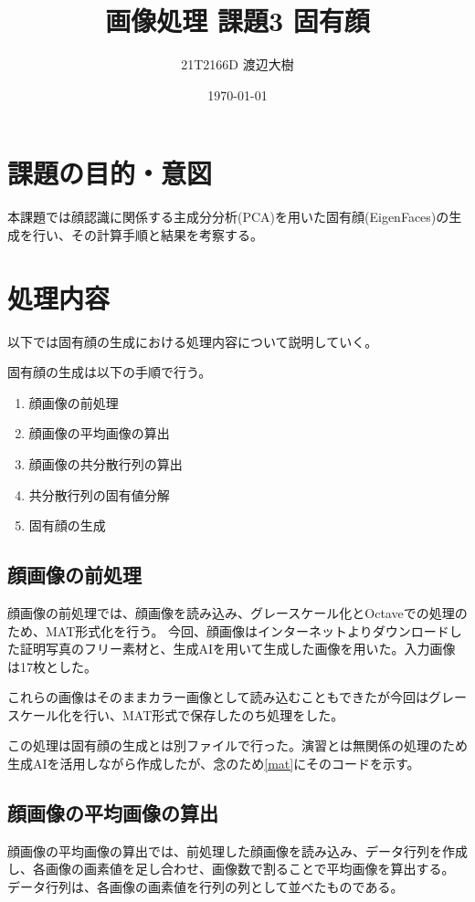 \documentclass[a4paper,11pt,dvipdfmx]{jsarticle}
\begin{document}

\title{画像処理 課題3 固有顔}
\author{21T2166D 渡辺大樹}
\date{\today}
\maketitle

\section{課題の目的・意図}
本課題では顔認識に関係する主成分分析(PCA)を用いた固有顔(EigenFaces)の生成を行い、その計算手順と結果を考察する。

\section{処理内容}
以下では固有顔の生成における処理内容について説明していく。

固有顔の生成は以下の手順で行う。
\begin{enumerate}
    \item 顔画像の前処理
    \item 顔画像の平均画像の算出
    \item 顔画像の共分散行列の算出
    \item 共分散行列の固有値分解
    \item 固有顔の生成
\end{enumerate}

\subsection{顔画像の前処理}
顔画像の前処理では、顔画像を読み込み、グレースケール化とOctaveでの処理のため、MAT形式化を行う。
今回、顔画像はインターネットよりダウンロードした証明写真のフリー素材と、生成AIを用いて生成した画像を用いた。入力画像は17枚とした。

これらの画像はそのままカラー画像として読み込むこともできたが今回はグレースケール化を行い、MAT形式で保存したのち処理をした。

この処理は固有顔の生成とは別ファイルで行った。演習とは無関係の処理のため生成AIを活用しながら作成したが、念のため\ref{mat}にそのコードを示す。

\subsection{顔画像の平均画像の算出}
顔画像の平均画像の算出では、前処理した顔画像を読み込み、データ行列を作成し、各画像の画素値を足し合わせ、画像数で割ることで平均画像を算出する。
データ行列は、各画像の画素値を行列の列として並べたものである。
\end{document}
